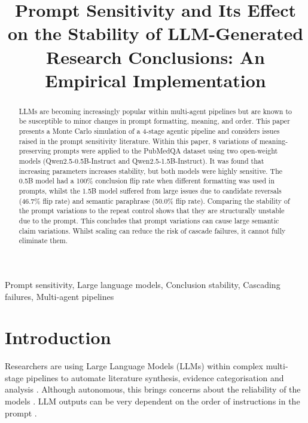 \documentclass[10pt, conference, letterpaper]{IEEEtran}
\begin{document}
\title{Prompt Sensitivity and Its Effect on the Stability of LLM-Generated Research Conclusions: An Empirical Implementation}

\author{
}

\maketitle

\begin{abstract}
LLMs are becoming increasingly popular within multi-agent pipelines but are known to be susceptible to minor changes in prompt formatting, meaning, and order. This paper presents a Monte Carlo simulation of a 4-stage agentic pipeline and considers issues raised in the prompt sensitivity literature. Within this paper, 8 variations of meaning-preserving prompts were applied to the PubMedQA dataset using two open-weight models (Qwen2.5-0.5B-Instruct and Qwen2.5-1.5B-Instruct). It was found that increasing parameters increases stability, but both models were highly sensitive. The 0.5B model had a 100\% conclusion flip rate when different formatting was used in prompts, whilst the 1.5B model suffered from large issues due to candidate reversals (46.7\% flip rate) and semantic paraphrase (50.0\% flip rate). Comparing the stability of the prompt variations to the repeat control shows that they are structurally unstable due to the prompt. This concludes that prompt variations can cause large semantic claim variations. Whilst scaling can reduce the risk of cascade failures, it cannot fully eliminate them.
\end{abstract}

\begin{IEEEkeywords}
Prompt sensitivity, Large language models, Conclusion stability, Cascading failures, Multi-agent pipelines
\end{IEEEkeywords}

\section{Introduction}
Researchers are using Large Language Models (LLMs) within complex multi-stage pipelines to automate literature synthesis, evidence categorisation and analysis \cite{wang2024survey, xi2023rise}. Although autonomous, this brings concerns about the reliability of the models \cite{mizrahi2024state}. LLM outputs can be very dependent on the order of instructions in the prompt \cite{reynolds2021prompt, zhou2023large}.
\end{document}
